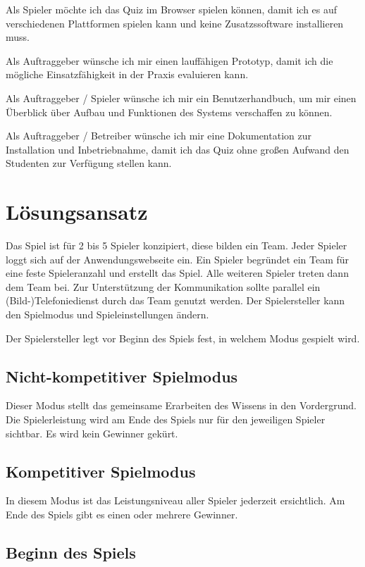 \documentclass[a4paper,11pt,listof=numbered,glossary=totoc,parskip=half]{scrreprt}
\begin{document}
Als Spieler möchte ich das Quiz im Browser spielen können, damit ich es auf verschiedenen Plattformen spielen kann und keine Zusatzssoftware installieren muss.

Als Auftraggeber wünsche ich mir einen lauffähigen Prototyp, damit ich die mögliche Einsatzfähigkeit in der Praxis evaluieren kann.

Als Auftraggeber / Spieler wünsche ich mir ein Benutzerhandbuch, um mir einen Überblick über Aufbau und Funktionen des Systems verschaffen zu können.

Als Auftraggeber / Betreiber wünsche ich mir eine Dokumentation zur Installation und Inbetriebnahme, damit ich das Quiz ohne großen Aufwand den Studenten zur Verfügung stellen kann.

	\newpage
	
	\section{Lösungsansatz}

Das Spiel ist für 2 bis 5 Spieler konzipiert, diese bilden ein Team.
Jeder Spieler loggt sich auf der Anwendungswebseite ein. Ein Spieler begründet ein Team für eine feste Spieleranzahl und erstellt das Spiel. Alle weiteren Spieler treten dann dem Team bei. Zur Unterstützung der Kommunikation sollte parallel ein (Bild-)Telefoniedienst durch das Team genutzt werden. Der Spielersteller kann den Spielmodus und Spieleinstellungen ändern.

Der Spielersteller legt vor Beginn des Spiels fest, in welchem Modus gespielt wird.

\subsection{Nicht-kompetitiver Spielmodus}

Dieser Modus stellt das gemeinsame Erarbeiten des Wissens in den Vordergrund. Die Spielerleistung wird am Ende des Spiels nur für den jeweiligen Spieler sichtbar. Es wird kein Gewinner gekürt.

\subsection{Kompetitiver Spielmodus}

In diesem Modus ist das Leistungsniveau aller Spieler jederzeit ersichtlich. Am Ende des Spiels gibt es einen oder mehrere Gewinner.


\subsection{Beginn des Spiels}
\end{document}
